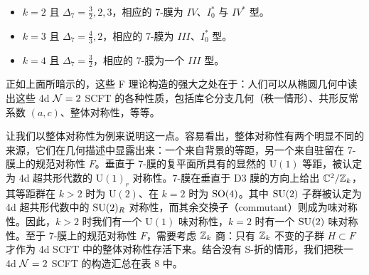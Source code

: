 
\begin{itemize}
  \item $k=2$ 且 $\Delta_7=\frac{3}{2}, 2, 3$，相应的 7-膜为 $IV$、$I_0^*$ 与 $IV^*$ 型。
  \item $k=3$ 且 $\Delta_7=\frac{4}{3}, 2$，相应的 7-膜为 $III$、$I_0^*$ 型。
  \item $k=4$ 且 $\Delta_7=\frac{3}{2}$，相应的 7-膜为一个 $III$ 型。
\end{itemize}

正如上面所暗示的，这些 F 理论构造的强大之处在于：人们可以从椭圆几何中读出这些 4d $\mathcal{N}=2$ SCFT 的各种性质，包括库仑分支几何（秩一情形）、共形反常系数 $(a,c)$、整体对称性，等等。

让我们以整体对称性为例来说明这一点。容易看出，整体对称性有两个明显不同的来源，它们在几何描述中显露出来：一个来自背景的等距，另一个来自驻留在 7-膜上的规范对称性 $F$。垂直于 7-膜的复平面所具有的显然的 $\mathrm{U}(1)$ 等距，被认定为 4d 超共形代数的 $\mathrm{U}(1)_r$ 对称性。7-膜在垂直于 D3 膜的方向上给出 $\mathbb{C}^2/\mathbb{Z}_k$，其等距群在 $k>2$ 时为 $\mathrm{U}(2)$、在 $k=2$ 时为 $\mathrm{SO}(4)$。其中 $\mathrm{SU}(2)$ 子群被认定为 4d 超共形代数中的 $\mathrm{SU}(2)_R$ 对称性，而其余交换子（commutant）则成为味对称性。因此，$k>2$ 时我们有一个 $\mathrm{U}(1)$ 味对称性，$k=2$ 时有一个 $\mathrm{SU}(2)$ 味对称性。至于 7-膜上的规范对称性 $F$，需要考虑 $\mathbb{Z}_k$ 商：只有 $\mathbb{Z}_k$ 不变的子群 $H\subset F$ 才作为 4d SCFT 中的整体对称性存活下来。结合没有 S-折的情形，我们把秩一 4d $\mathcal{N}=2$ SCFT 的构造汇总在表 8 中。


